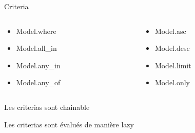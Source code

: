 \documentclass{beamer}
\begin{document}
\begin{frame}
  
\end{frame}

\begin{frame}
  
\end{frame}

\begin{frame}

  \begin{center}
    \Huge{}
    Criteria
  \end{center}

  \begin{columns}[t]

    \begin{column}{5cm}
      \begin{itemize}
        \item Model.where
        \item Model.all\_in
        \item Model.any\_in
        \item Model.any\_of
      \end{itemize}
    \end{column}

    \begin{column}{5cm}
      \begin{itemize}
        \item Model.asc
        \item Model.desc
        \item Model.limit
        \item Model.only
      \end{itemize}
    \end{column}

  \end{columns}

\end{frame}

\begin{frame}
  \begin{center}
    \Huge{}
    Les criterias sont chainable
  \end{center}
\end{frame}

\begin{frame}
  \begin{center}
    \Huge{}
    Les criterias sont évalués de manière lazy
  \end{center}
\end{frame}
\end{document}
